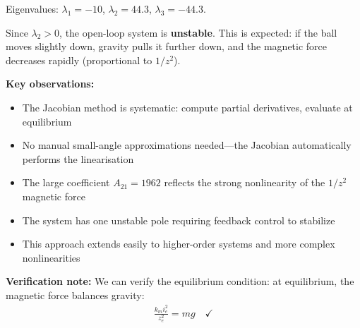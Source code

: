 \documentclass[11pt,a4paper]{article}
\begin{document}
Eigenvalues: $\lambda_1 = -10$, $\lambda_2 = 44.3$, $\lambda_3 = -44.3$.

Since $\lambda_2 > 0$, the open-loop system is \textbf{unstable}. This is expected: if the ball moves slightly down, gravity pulls it further down, and the magnetic force decreases rapidly (proportional to $1/z^2$).

\textbf{Key observations:}
\begin{itemize}
\item The Jacobian method is systematic: compute partial derivatives, evaluate at equilibrium
\item No manual small-angle approximations needed---the Jacobian automatically performs the linearisation
\item The large coefficient $A_{21} = 1962$ reflects the strong nonlinearity of the $1/z^2$ magnetic force
\item The system has one unstable pole requiring feedback control to stabilize
\item This approach extends easily to higher-order systems and more complex nonlinearities
\end{itemize}

\textbf{Verification note:} We can verify the equilibrium condition: at equilibrium, the magnetic force balances gravity:
\begin{align}
\frac{k_m i_e^2}{z_e^2} = mg \quad \checkmark
\end{align}
\end{document}
